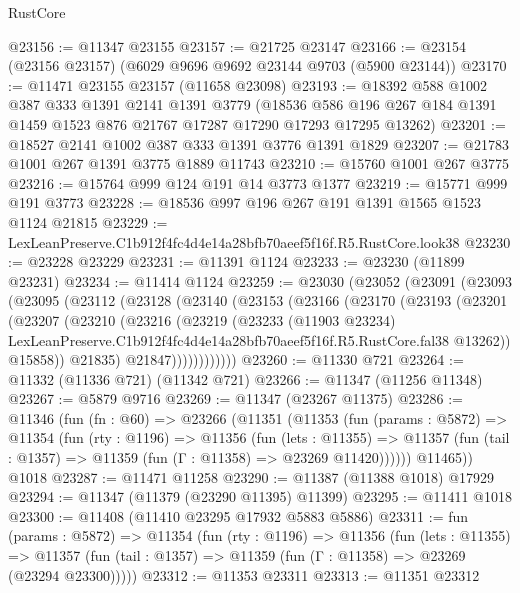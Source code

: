 \begin{lexlean}{RustCore}
\begin{coremodule}
@23156 := @11347 @23155
@23157 := @21725 @23147
@23166 := @23154 (@23156 @23157) (@6029 @9696 @9692 @23144 @9703 (@5900 @23144))
@23170 := @11471 @23155 @23157 (@11658 @23098)
@23193 := @18392
    @588
    @1002
    @387
    @333
    @1391
    @2141
    @1391
    @3779
    (@18536 @586 @196 @267 @184 @1391 @1459 @1523 @876 @21767 @17287 @17290 @17293 @17295 @13262)
@23201 := @18527 @2141 @1002 @387 @333 @1391 @3776 @1391 @1829
@23207 := @21783 @1001 @267 @1391 @3775 @1889 @11743
@23210 := @15760 @1001 @267 @3775
@23216 := @15764 @999 @124 @191 @14 @3773 @1377
@23219 := @15771 @999 @191 @3773
@23228 := @18536 @997 @196 @267 @191 @1391 @1565 @1523 @1124 @21815
@23229 := LexLeanPreserve.C1b912f4fc4d4e14a28bfb70aeef5f16f.R5.RustCore.look38
@23230 := @23228 @23229
@23231 := @11391 @1124
@23233 := @23230 (@11899 @23231)
@23234 := @11414 @1124
@23259 := @23030
    (@23052
      (@23091
        (@23093
          (@23095
            (@23112
              (@23128
                (@23140
                  (@23153
                    (@23166
                      (@23170
                        (@23193
                          (@23201
                            (@23207
                              (@23210
                                (@23216
                                  (@23219
                                    (@23233
                                      (@11903 @23234)
                                      LexLeanPreserve.C1b912f4fc4d4e14a28bfb70aeef5f16f.R5.RustCore.fal38
                                      @13262))
                                  @15858))
                              @21835)
                            @21847))))))))))))
@23260 := @11330 @721
@23264 := @11332 (@11336 @721) (@11342 @721)
@23266 := @11347 (@11256 @11348)
@23267 := @5879 @9716
@23269 := @11347 (@23267 @11375)
@23286 := @11346
    (fun (fn : @60) =>
    @23266
      (@11351
        (@11353
          (fun (params : @5872) =>
          @11354
            (fun (rty : @1196) =>
            @11356
              (fun (lets : @11355) =>
              @11357 (fun (tail : @1357) => @11359 (fun (Γ : @11358) => @23269 @11420))))))
        @11465))
    @1018
@23287 := @11471 @11258
@23290 := @11387 (@11388 @1018) @17929
@23294 := @11347 (@11379 (@23290 @11395) @11399)
@23295 := @11411 @1018
@23300 := @11408 (@11410 @23295 @17932 @5883 @5886)
@23311 := fun (params : @5872) =>
  @11354
    (fun (rty : @1196) =>
    @11356
      (fun (lets : @11355) =>
      @11357 (fun (tail : @1357) => @11359 (fun (Γ : @11358) => @23269 (@23294 @23300)))))
@23312 := @11353 @23311
@23313 := @11351 @23312

\end{coremodule}
\end{lexlean}
